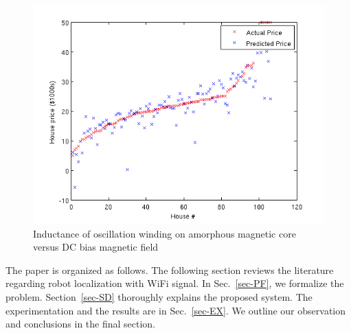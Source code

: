 \documentclass[letterpaper, 10 pt, conference]{ieeeconf}  %
\begin{document}
  \begin{figure}[thpb]
     \centering
     \includegraphics[scale=0.4]{figures/sample_figure.png}
     \caption{Inductance of oscillation winding on amorphous
      magnetic core versus DC bias magnetic field}
\label{fig-sample}
  \end{figure}
  The paper is organized as follows.
  The following section reviews the literature regarding robot localization with WiFi signal.
  In Sec.~\ref{sec-PF}, we formalize the problem.
  Section~\ref{sec-SD} thoroughly explains the proposed system.
  The experimentation and the results are  in Sec.~\ref{sec-EX}.
  We outline our observation and conclusions in the final section.

%
%
%
\end{document}
